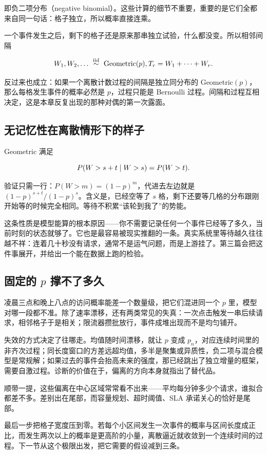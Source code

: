即负二项分布（negative binomial）。这些计算的细节不重要，重要的是它们全都来自同一句话：格子独立，所以概率直接连乘。

一个事件发生之后，剩下的格子还是原来那串独立试验，什么都没变。所以相邻间隔

\[
W_1,W_2,\ldots\ \overset{\iid}{\sim}\ \mathrm{Geometric}(p),
\qquad T_r=W_1+\cdots+W_r.
\]

反过来也成立：如果一个离散计数过程的间隔是独立同分布的 Geometric\((p)\)，那么每格发生事件的概率必然是 \(p\)，过程只能是 Bernoulli 过程。间隔和过程互相决定，这是本章反复出现的那种对偶的第一次露面。

\subsection{无记忆性在离散情形下的样子}

Geometric 满足

\[
P(W>s+t\mid W>s)=P(W>t).
\]

验证只需一行：\(P(W>m)=(1-p)^m\)，代进去左边就是 \((1-p)^{s+t}/(1-p)^{s}\)。含义是，已经空等了 \(s\) 格，剩下还要等几格的分布跟刚开始等的时候完全相同。等待不积累``该轮到我了''的势能。

这条性质是模型能算的根本原因——你不需要记录任何一个事件已经等了多久，当前时刻的状态就够了。它也是最容易被现实推翻的一条。真实系统里等待越久往往越不祥：连着几十秒没有请求，通常不是运气问题，而是上游挂了。第三篇会把这件事展开，并给出一个能在数据上跑的检验。

\subsection{固定的 \texorpdfstring{\(p\)}{p} 撑不了多久}

凌晨三点和晚上八点的访问概率能差一个数量级，把它们混进同一个 \(p\) 里，模型对哪一段都不准。除了速率漂移，还有两类常见的失真：一次点击触发一串后续请求，相邻格子于是相关；限流器攒批放行，事件成堆出现而不是均匀铺开。

失效的方式决定了往哪走。均值随时间漂移，就让 \(p\) 变成 \(p_n\)，对应连续时间里的非齐次过程；同长度窗口的方差远超均值，多半是聚集或异质性，负二项与混合模型是常规解；如果过去的事件会抬高未来的强度，那已经跳出了独立增量的框架，需要自激过程。诊断的价值在于，偏离的方向本身就指出了替代品。

顺带一提，这些偏离在中心区域常常看不出来——平均每分钟多少个请求，谁拟合都差不多。差别出在尾部，而容量规划、超时阈值、SLA 承诺关心的恰好是尾部。

最后一步把格子宽度压到零。若每个小区间发生一次事件的概率与区间长度成正比，而发生两次以上的概率是更高阶的小量，离散逼近就收敛到一个连续时间的过程。下一节从这个极限出发，把它需要的假设减到三条。
